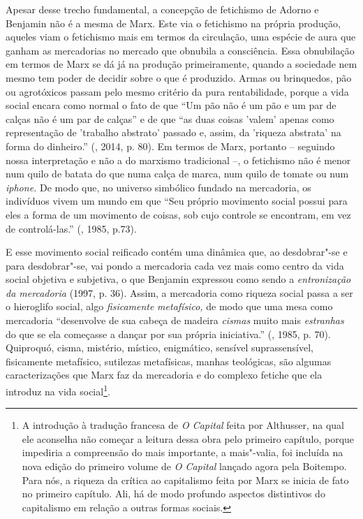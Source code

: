 Apesar desse trecho fundamental, a concepção de fetichismo de Adorno e
Benjamin não é a mesma de Marx. Este via o fetichismo na própria
produção, aqueles viam o fetichismo mais em termos da circulação, uma
espécie de aura que ganham as mercadorias no mercado que obnubila a
consciência. Essa obnubilação em termos de Marx se dá já na produção
primeiramente, quando a sociedade nem mesmo tem poder de decidir sobre o
que é produzido. Armas ou brinquedos, pão ou agrotóxicos passam pelo
mesmo critério da pura rentabilidade, porque a vida social encara como
normal o fato de que ``Um pão não é um pão e um par de calças não é um
par de calças'' e de que ``as duas coisas 'valem' apenas como
representação de 'trabalho abstrato' passado e, assim, da 'riqueza
abstrata' na forma do dinheiro.'' (, 2014, p. 80). Em termos de
Marx, portanto -- seguindo nossa interpretação e não a do marxismo
tradicional --, o fetichismo não é menor num quilo de batata do que numa
calça de marca, num quilo de tomate ou num \emph{iphone.} De modo que,
no universo simbólico fundado na mercadoria, os indivíduos vivem um
mundo em que ``Seu próprio movimento social possui para eles a forma de
um movimento de coisas, sob cujo controle se encontram, em vez de
controlá-las.'' (, 1985, p.73).

E esse movimento social reificado contém uma dinâmica que, ao
desdobrar"-se e para desdobrar"-se, vai pondo a mercadoria cada vez mais
como centro da vida social objetiva e subjetiva, o que Benjamin
expressou como sendo a \emph{entronização da mercadoria} (1997, p. 36).
Assim, a mercadoria como riqueza social passa a ser o hieroglifo social,
algo \emph{fisicamente} \emph{metafísico,} de modo que uma mesa como
mercadoria ``desenvolve de sua cabeça de madeira \emph{cismas} muito
mais \emph{estranhas} do que se ela começasse a dançar por sua própria
iniciativa.'' (, 1985, p. 70). Quiproquó, cisma, mistério, místico,
enigmático, sensível suprassensível, fisicamente metafísico, sutilezas
metafísicas, manhas teológicas, são algumas caracterizações que Marx faz
da mercadoria e do complexo fetiche que ela introduz na vida
social\footnote{A introdução à tradução francesa de \emph{O Capital}
  feita por Althusser, na qual ele aconselha não começar a leitura dessa
  obra pelo primeiro capítulo, porque impediria a compreensão do mais
  importante, a mais"-valia, foi incluída na nova edição do primeiro
  volume de \emph{O Capital} lançado agora pela Boitempo. Para nós, a
  riqueza da crítica ao capitalismo feita por Marx se inicia de fato no
  primeiro capítulo. Ali, há de modo profundo aspectos distintivos do
  capitalismo em relação a outras formas sociais.}.

